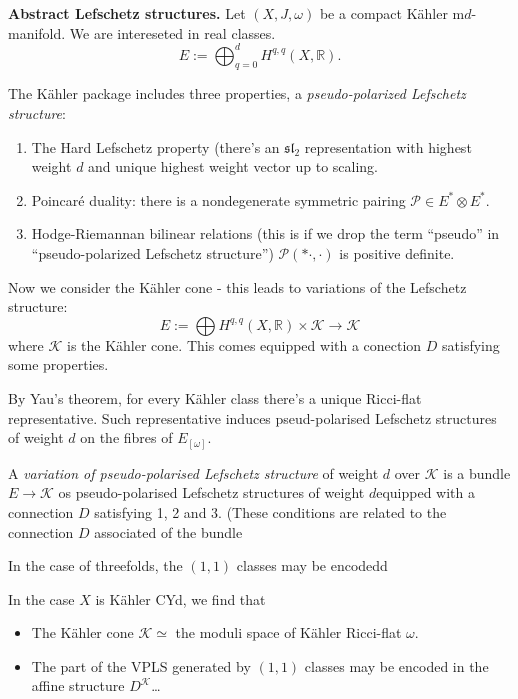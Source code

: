 \medskip\noindent
{\bf Abstract Lefschetz structures.} 
Let $(X,J,\omega)$ be a compact Kähler
m$d$-manifold. 
We are intereseted in real classes.
$$
E:= \bigoplus_{q=0}^d
H^{q,q}(X,\mathbb{R}).
$$

The Kähler package includes
three properties,
a {\it pseudo-polarized Lefschetz
structure}:
\begin{enumerate}
\item The Hard Lefschetz property
(there's an $\mathfrak{sl}_2$ representation
with highest weight $d$ and unique highest
weight vector up to scaling.
\item Poincaré duality: there is a
nondegenerate symmetric pairing
$\mathcal{P} \in E^* \otimes E ^*$.
\item Hodge-Riemannan bilinear relations
(this is if we drop the term ``pseudo''
in ``pseudo-polarized Lefschetz structure'')
$\mathcal{P}(* \cdot,\cdot)$ is positive
definite.
\end{enumerate}

\medskip\noindent
Now we consider the Kähler cone -
this leads to variations of the Lefschetz
structure:
$$
E:= \bigoplus H^{q,q}(X,\mathbb{R})\times
\mathcal{K} \to \mathcal{K}
$$
where $\mathcal{K}$ is the Kähler cone.
This comes equipped with a conection $D$
satisfying some properties.

By Yau's theorem, for every Kähler class
there's a unique Ricci-flat representative.
Such representative induces pseud-polarised
Lefschetz structures of weight $d$ on the
fibres of $E_{[\omega]}$.

\begin{definition}
\label{definition-}
A {\it variation of pseudo-polarised
Lefschetz structure} of weight
$d$ over $\mathcal{K}$ is a bundle
$E \to \mathcal{K}$ os pseudo-polarised
Lefschetz structures of weight $d$equipped
with a connection $D$ satisfying 1, 2 and 3.
(These conditions are related to the
connection $D$ associated of the bundle
\end{definition}

In the case of threefolds, the $(1,1)$
classes may be encodedd 

In the case $X$ is Kähler CYd, we find that
\begin{itemize}
\item The Kähler cone $\mathcal{K} \simeq$
the moduli space of Kähler Ricci-flat
$\omega$.
\item The part of the VPLS generated
by $(1,1)$ classes may be encoded
in the affine structure $D^{\mathcal{K}}$…
\end{itemize}


